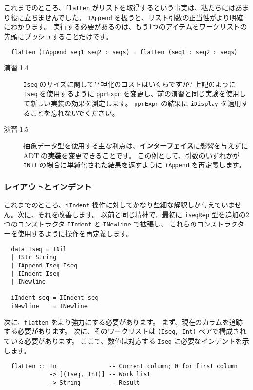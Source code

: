 \documentclass{jarticle}
\begin{document}
これまでのところ、\texttt{flatten} がリストを取得するという事実は、私たちにはあまり役に立ちませんでした。
\texttt{IAppend} を扱うと、リスト引数の正当性がより明確にわかります。
実行する必要があるのは、もう1つのアイテムをワークリストの先頭にプッシュすることだけです。

\begin{verbatim}
  flatten (IAppend seq1 seq2 : seqs) = flatten (seq1 : seq2 : seqs)
\end{verbatim}

\begin{description}
	\item[演習 1.4] \texttt{Iseq} のサイズに関して平坦化のコストはいくらですか?
		上記のように \texttt{Iseq} を使用するように \texttt{pprExpr} を変更し、前の演習と同じ実験を使用して新しい実装の効果を測定します。
		\texttt{pprExpr} の結果に \texttt{iDisplay} を適用することを忘れないでください。

	\item[演習 1.5] 抽象データ型を使用する主な利点は、\textbf{インターフェイス}に影響を与えずに ADT の\textbf{実装}を変更できることです。
		この例として、引数のいずれかが \texttt{INil} の場合に単純化された結果を返すように \texttt{iAppend} を再定義します。
\end{description}

\subsubsection{レイアウトとインデント}

これまでのところ、\texttt{iIndent} 操作に対してかなり些細な解釈しか与えていません。次に、それを改善します。
以前と同じ精神で、最初に \texttt{iseqRep} 型を追加の2つのコンストラクタ \texttt{IIndent} と \texttt{INewline} で拡張し、
これらのコンストラクターを使用するように操作を再定義します。

\begin{verbatim}
  data Iseq = INil
  | IStr String
  | IAppend Iseq Iseq
  | IIndent Iseq
  | INewline

  iIndent seq = IIndent seq
  iNewline    = INewline
\end{verbatim}

次に、\texttt{flatten} をより強力にする必要があります。
まず、現在のカラムを追跡する必要があります。
次に、そのワークリストは \texttt{(Iseq, Int)} ペアで構成されている必要があります。
ここで、数値は対応する \texttt{Iseq} に必要なインデントを示します。

\begin{verbatim}
  flatten :: Int              -- Current column; 0 for first column
             -> [(Iseq, Int)] -- Work list
             -> String        -- Result
\end{verbatim}
\end{document}

